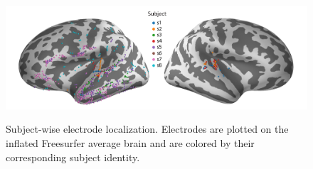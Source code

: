 \renewcommand{\figurename}{Supplementary Figure}
\setcounter{figure}{0}

\begin{figure}[ht]
  \centering
  {\includegraphics[width=0.95\linewidth]{supplementary_figures/Figure_supplemental_subject_ID_727-01.png}}
  \caption{Subject-wise electrode localization. Electrodes are plotted on the inflated Freesurfer average brain and are colored by their corresponding subject identity.}
  \label{fig:s1}
\end{figure}


